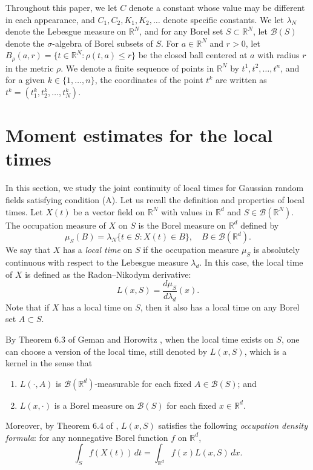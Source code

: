 \documentclass[11pt, reqno]{amsart}
\def\R{{\mathbb R}}
\numberwithin{equation}{section}
\begin{document}
Throughout this paper, we let $C$ denote a constant whose value may be different in each appearance, and 
$C_1, C_2, K_1, K_2, \dots$ denote specific constants. We let $\lambda_N$ denote the Lebesgue measure on 
$\R^N$, and for any Borel set $S \subset \R^N$, let $\mathscr{B}(S)$ denote the $\sigma$-algebra of Borel subsets
of $S$. For $a \in \R^N$ and $r > 0$, let $B_\rho(a, r) = \{ t \in \R^N : \rho(t, a) \le r \}$ be the closed ball centered 
at $a$ with radius $r$ in the metric $\rho$. We denote a finite sequence of points in $\R^N$ by $t^1, t^2, \dots, t^n$, 
and for a given $k \in \{1, \dots, n\}$, the coordinates of the point $t^k$ are written as $t^k = (t^k_1, t^k_2, \dots, t^k_N)$.

\smallskip

\section{Moment estimates for the local times}
\label{sect:cont}

In this section, we study the joint continuity of local times for Gaussian random fields satisfying condition (A).
Let us recall the definition and properties of local times.
Let $X(t)$ be a vector field on $\R^N$ with values in $\R^d$ and $S \in \mathscr{B}(\R^N)$.
The occupation measure of $X$ on $S$ is the Borel measure on $\R^d$ defined by
\[\mu_S(B) = \lambda_N\{ t \in S : X(t) \in B \}, \quad B \in \mathscr{B}(\R^d).\]
We say that $X$ has a \emph{local time} on $S$ if the occupation measure $\mu_S$ is absolutely continuous 
with respect to the Lebesgue measure $\lambda_d$. In this case, the local time of $X$ is defined as the 
Radon--Nikodym derivative:
\[ L(x, S) = \frac{d\mu_S}{d\lambda_d}(x). \]
Note that if $X$ has a local time on $S$, then it also has a local time on any Borel set $A \subset S$.

By Theorem 6.3 of Geman and Horowitz \cite{GH80}, when the local time exists on $S$, one can choose a 
version of the local time, still denoted by $L(x, S)$, which is a kernel in the sense that
\begin{enumerate}
\item[(i)] $L(\cdot, A)$ is $\mathscr{B}(\R^d)$-measurable for each fixed $A \in \mathscr{B}(S)$; and
\item[(ii)] $L(x, \cdot)$ is a Borel measure on $\mathscr{B}(S)$ for each fixed $x \in \R^d$.
\end{enumerate}
Moreover, by Theorem 6.4 of \cite{GH80}, $L(x, S)$ satisfies the following \emph{occupation density formula}: 
for any nonnegative Borel function $f$ on $\R^d$,
\begin{equation}\label{Eq:ODF}
\int_S f(X(t)) \,dt = \int_{\R^d} f(x) L(x, S) \, dx.
\end{equation}
\end{document}
